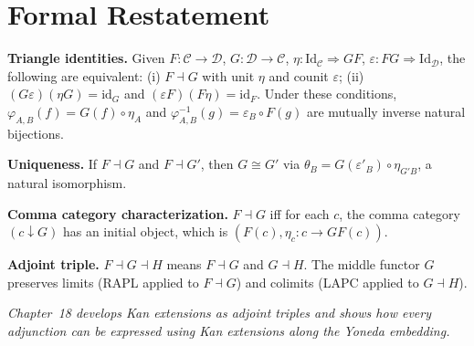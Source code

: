 \section*{Formal Restatement}

\begin{formalrestatement}
\textbf{Triangle identities.} Given $F : \mathcal{C} \to \mathcal{D}$,
$G : \mathcal{D} \to \mathcal{C}$, $\eta : \mathrm{Id}_\mathcal{C} \Rightarrow GF$,
$\varepsilon : FG \Rightarrow \mathrm{Id}_\mathcal{D}$, the following are
equivalent: (i) $F \dashv G$ with unit $\eta$ and counit $\varepsilon$; (ii)
$(G\varepsilon)(\eta G) = \mathrm{id}_G$ and $(\varepsilon F)(F\eta) =
\mathrm{id}_F$. Under these conditions, $\varphi_{A,B}(f) = G(f) \circ \eta_A$
and $\varphi^{-1}_{A,B}(g) = \varepsilon_B \circ F(g)$ are mutually inverse
natural bijections.

\medskip
\textbf{Uniqueness.} If $F \dashv G$ and $F \dashv G'$, then $G \cong G'$
via $\theta_B = G(\varepsilon'_B) \circ \eta_{G'B}$, a natural isomorphism.

\medskip
\textbf{Comma category characterization.} $F \dashv G$ iff for each $c$,
the comma category $(c \downarrow G)$ has an initial object, which is
$(F(c), \eta_c : c \to GF(c))$.

\medskip
\textbf{Adjoint triple.} $F \dashv G \dashv H$ means $F \dashv G$ and
$G \dashv H$. The middle functor $G$ preserves limits (RAPL applied to
$F \dashv G$) and colimits (LAPC applied to $G \dashv H$).

\medskip
\noindent\textit{Chapter~18 develops Kan extensions as adjoint triples and
shows how every adjunction can be expressed using Kan extensions along the
Yoneda embedding.}
\end{formalrestatement}
